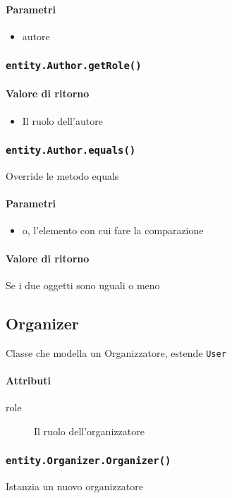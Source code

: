 \paragraph{Parametri}
\begin{itemize}
\item autore
\end{itemize}

\subsubsection{\texttt{entity.Author.getRole()}}
\paragraph{Valore di ritorno}
\begin{itemize}
\item Il ruolo dell'autore
\end{itemize}

\subsubsection{\texttt{entity.Author.equals()}}
Override le metodo equals
\paragraph{Parametri}
\begin{itemize}
\item o, l'elemento con cui fare la comparazione
\end{itemize}
\paragraph{Valore di ritorno}
Se i due oggetti sono uguali o meno

\subsection{Organizer}
Classe che modella un Organizzatore, estende \texttt{User}
\paragraph{Attributi}
\begin{description}
\item[role] Il ruolo dell'organizzatore
\end{description}

\subsubsection{\texttt{entity.Organizer.Organizer()}}
Istanzia un nuovo organizzatore
